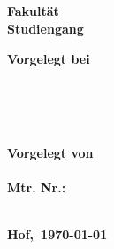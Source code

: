 \begin{titlepage} %
	
	\center %
	
	
	\textbf{\Large \mytitle}\\[0.5cm]
	\textbf{\large \mysubtitle}\\[0.5cm]

  \vspace{3cm}

  \textbf{\Large \textls{\mydoctype}}\\[0.8cm]
	
  \textbf{\myuniname{}\\
  Fakultät \myfaculty{}\\
  Studiengang \mycourse{}}\\[0.5cm]
	
  \vfill\vfill\vfill

	\begin{minipage}{0.4\textwidth}
		\begin{flushleft}
			\textbf{Vorgelegt bei\\
      \mydocent{}\\
      \myunistreet{} \myuninumber{}\\
      \myunizip{} \myuniplace{}
      }
		\end{flushleft}
	\end{minipage}
	~
	\begin{minipage}{0.4\textwidth}
		\begin{flushright}
			\textbf{
      Vorgelegt von\\
      \myname{}\\
      Mtr. Nr.: \mymatrnr{}\\
      \mystreet{} \mynumber{}\\
      \myzip{} \myplace{}
      }
		\end{flushright}
	\end{minipage}
	
  \vfill

	
	\textbf{Hof,~\today} %
	
	
\end{titlepage}
\restoregeometry
